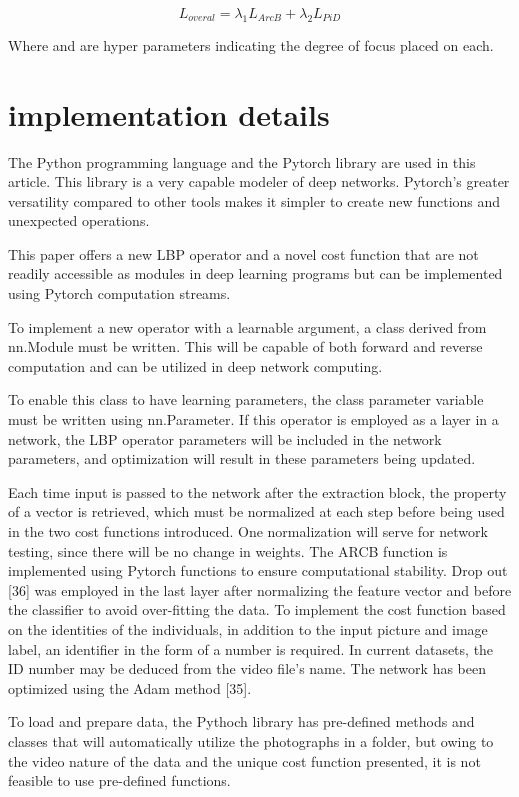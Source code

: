 \documentclass[journal]{IEEEtran}
\begin{document}
\begin{equation}\label{eq:ltot}
	L_{overal} = \lambda_1L_{ArcB} + \lambda_2L_{PiD}
\end{equation}

Where  and  are hyper parameters indicating the degree of focus placed on each.

\section{implementation details}

The Python programming language and the Pytorch library are used in this article. This library is a very capable modeler of deep networks.
Pytorch's greater versatility compared to other tools makes it simpler to create new functions and unexpected operations.

This paper offers a new LBP operator and a novel cost function that are not readily accessible as modules in deep learning programs but can be implemented using Pytorch computation streams.

To implement a new operator with a learnable argument, a class derived from nn.Module must be written. This will be capable of both forward and reverse computation and can be utilized in deep network computing.

To enable this class to have learning parameters, the class parameter variable must be written using nn.Parameter. If this operator is employed as a layer in a network, the LBP operator parameters will be included in the network parameters, and optimization will result in these parameters being updated.

Each time input is passed to the network after the extraction block, the property of a vector is retrieved, which must be normalized at each step before being used in the two cost functions introduced. One normalization will serve for network testing, since there will be no change in weights. The ARCB function is implemented using Pytorch functions to ensure computational stability. Drop out [36] was employed in the last layer after normalizing the feature vector and before the classifier to avoid over-fitting the data.
To implement the cost function based on the identities of the individuals, in addition to the input picture and image label, an identifier in the form of a number is required. In current datasets, the ID number may be deduced from the video file's name. The network has been optimized using the Adam method [35].

To load and prepare data, the Pythoch library has pre-defined methods and classes that will automatically utilize the photographs in a folder, but owing to the video nature of the data and the unique cost function presented, it is not feasible to use pre-defined functions.
\end{document}

